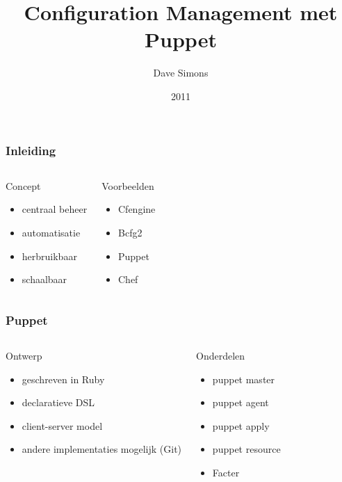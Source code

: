\documentclass{beamer}
\begin{document}
\title{Configuration Management met Puppet}
\author[D. Simons]{Dave Simons}
\date{2011}
\maketitle


\begin{frame}
\frametitle{Inleiding}
\begin{columns}[c]
\begin{block}{Concept}
\begin{itemize}
	\item centraal beheer
	\item automatisatie
	\item herbruikbaar
	\item schaalbaar
\end{itemize}
\end{block}
\begin{block}{Voorbeelden}
\begin{itemize}
	\item Cfengine
	\item Bcfg2
	\item Puppet
	\item Chef
\end{itemize}
\end{block}
\end{columns}
\end{frame}

\begin{frame}
\frametitle{Puppet}
\begin{columns}[c]
\begin{block}{Ontwerp}
\begin{itemize}
	\item geschreven in Ruby
	\item declaratieve DSL
	\item client-server model
	\item andere implementaties mogelijk (Git)
\end{itemize}
\end{block}
\begin{block}{Onderdelen}
\begin{itemize}
	\item puppet master
	\item puppet agent
	\item puppet apply
	\item puppet resource
	\item Facter
\end{itemize}
\end{block}
\end{columns}
\end{frame}
\end{document}
